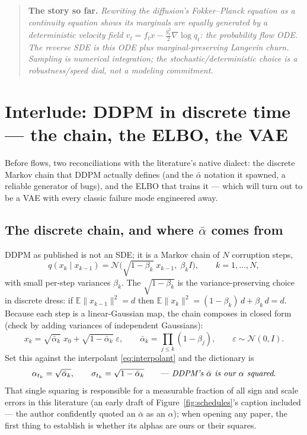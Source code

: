 \documentclass[10pt,a4paper]{article}
\newenvironment{recap}
{\par\medskip\noindent\begin{quote}\small\textbf{The story so far.}\itshape\;}
{\end{quote}\medskip}
\newcommand{\E}{\mathbb{E}}
\newcommand{\veps}{\varepsilon}
\begin{document}
\begin{recap}
Rewriting the diffusion's Fokker--Planck equation as a continuity equation
shows its marginals are equally generated by a deterministic velocity
field $v_t = f_t x - \tfrac{g_t^2}{2}\nabla\log q_t$: the probability flow
ODE. The reverse SDE is this ODE plus marginal-preserving Langevin churn.
Sampling is numerical integration; the stochastic/deterministic choice is
a robustness/speed dial, not a modeling commitment.
\end{recap}

\section{Interlude: DDPM in discrete time --- the chain, the ELBO, the VAE}
\label{sec:elbo}

Before flows, two reconciliations with the literature's native dialect:
the discrete Markov chain that DDPM actually defines (and the
$\bar\alpha$ notation it spawned, a reliable generator of bugs), and the
ELBO that trains it --- which will turn out to be a VAE with every
classic failure mode engineered away.

\subsection{The discrete chain, and where $\bar\alpha$ comes from}
\label{sec:discrete}

DDPM as published is not an SDE; it is a Markov chain of $N$ corruption
steps,
\begin{equation}
q(x_k \mid x_{k-1})
= \mathcal{N}\big( \sqrt{1 - \beta_k}\; x_{k-1},\; \beta_k I \big),
\qquad k = 1, \ldots, N,
\label{eq:ddpm-chain}
\end{equation}
with small per-step variances $\beta_k$. The $\sqrt{1 - \beta_k}$ is the
variance-preserving choice in discrete dress: if
$\E\|x_{k-1}\|^2 = d$ then
$\E\|x_k\|^2 = (1 - \beta_k)\, d + \beta_k\, d = d$. Because each step is
a linear-Gaussian map, the chain composes in closed form (check by
adding variances of independent Gaussians):
\begin{equation}
x_k = \sqrt{\bar\alpha_k}\; x_0 + \sqrt{1 - \bar\alpha_k}\;\veps,
\qquad
\bar\alpha_k = \prod_{j \le k} (1 - \beta_j),
\qquad \veps \sim \mathcal{N}(0, I).
\label{eq:ddpm-marginal}
\end{equation}
Set this against the interpolant \eqref{eq:interpolant} and the
dictionary is
\begin{equation}
\alpha_{t_k} = \sqrt{\bar\alpha_k}, \qquad
\sigma_{t_k} = \sqrt{1 - \bar\alpha_k}
\qquad \text{--- \emph{DDPM's $\bar\alpha$ is our $\alpha$ squared}.}
\end{equation}
That single squaring is responsible for a measurable fraction of all
sign and scale errors in this literature (an early draft of
Figure~\ref{fig:schedules}'s caption included --- the author confidently
quoted an $\bar\alpha$ as an $\alpha$); when opening any paper, the
first thing to establish is whether its alphas are ours or their
squares.
\end{document}
